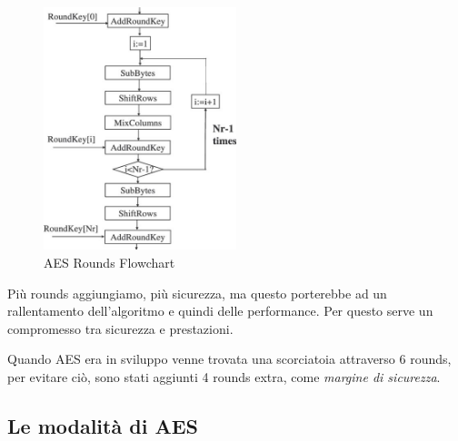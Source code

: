 \begin{figure}[H] %
	\centering
	\includegraphics[width=0.5\textwidth, height=0.5\textheight, keepaspectratio]{./images/aes/flowcharts/aes_flowchart.png}
	\caption{AES Rounds Flowchart}
	\label{fig:aes_flowchart2}
\end{figure}

\textsf{\small Più rounds aggiungiamo, più sicurezza, ma questo porterebbe ad un rallentamento dell'algoritmo e quindi delle performance.}
\textsf{\small Per questo serve un compromesso tra sicurezza e prestazioni.}

\textsf{\small Quando AES era in sviluppo venne trovata una scorciatoia attraverso 6 rounds, per evitare ciò, sono stati aggiunti 4 rounds extra, come \emph{margine di sicurezza}.} %



\subsection{Le modalità di AES} %

